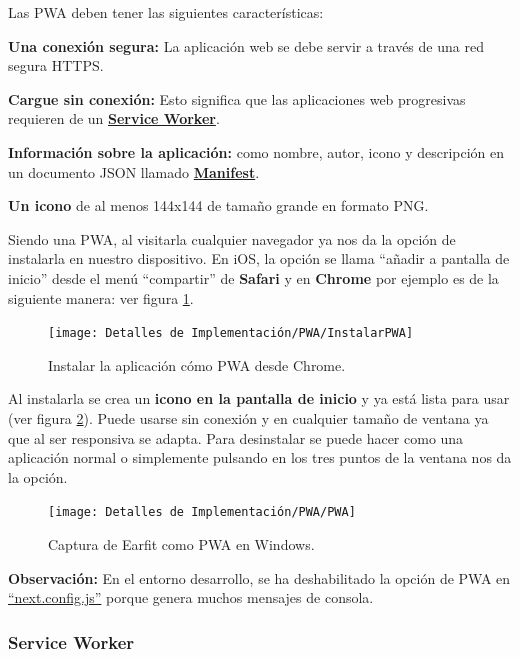 \documentclass[12pt,twoside,titlepage]{report}
\begin{document}
Las PWA deben tener las siguientes características:

\begin{compactitem}

    \item \textbf{Una conexión segura:} La aplicación web se debe servir a través de una red segura HTTPS.
    \item \textbf{Cargue sin conexión:} Esto significa que las aplicaciones web progresivas requieren de un \hyperref[sec:serviceWorker]{\textbf{Service Worker}}.
    \item \textbf{Información sobre la aplicación:} como nombre, autor, icono y descripción en un documento JSON llamado \hyperref[sec:manifest]{\textbf{Manifest}}.
    \item \textbf{Un icono} de al menos 144x144 de tamaño grande en formato PNG.
\end{compactitem}

Siendo una PWA, al visitarla cualquier navegador ya nos da la opción de instalarla en nuestro dispositivo. En iOS, la opción se llama ``añadir a pantalla de inicio'' desde el menú ``compartir'' de \textbf{Safari} y en \textbf{Chrome} por ejemplo es de la siguiente manera: ver figura \ref{fig:InstalarPWA}.

\begin{figure}[H]
    \centering
    \texttt{[image: Detalles de Implementación/PWA/InstalarPWA]}
    \caption{Instalar la aplicación cómo PWA desde Chrome.}
    \label{fig:InstalarPWA}
\end{figure}

Al instalarla se crea un \textbf{icono en la pantalla de inicio} y ya está lista para usar (ver figura \ref{fig:PWA}). Puede usarse sin conexión y en cualquier tamaño de ventana ya que al ser responsiva se adapta. Para desinstalar se puede hacer como una aplicación normal o simplemente pulsando en los tres puntos de la ventana nos da la opción.

\begin{figure}[H]
    \centering
    \texttt{[image: Detalles de Implementación/PWA/PWA]}
    \caption{Captura de Earfit como PWA en Windows.}
    \label{fig:PWA}
\end{figure}

\textbf{Observación:} En el entorno desarrollo, se ha deshabilitado la opción de PWA en \href{https://github.com/alberttogoca/EarFit/blob/main/next.config.js}{``next.config.js''} porque genera muchos mensajes de consola.

\subsubsection{Service Worker}
\label{sec:serviceWorker}
\end{document}
